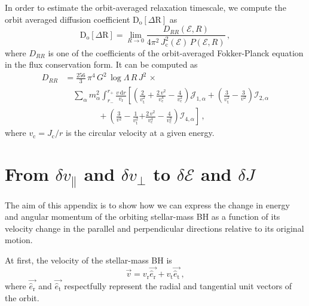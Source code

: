 \documentclass[desactivate]{aa}
\begin{document}
\begin{appendix}
    In order to estimate the orbit-averaged relaxation timescale, we compute the orbit averaged diffusion coefficient $\mathrm{D}_\mathrm{o}[\Delta \mathrm{R}]$ as
    \begin{equation}
        \mathrm{D}_\mathrm{o}[\Delta \mathrm{R}] = \lim_{R\to 0} \frac{D_{RR}(\mathcal{E}, R)}{4\pi^2\,J_\mathrm{c}^2(\mathcal{E})\,P(\mathcal{E}, R)} \, ,
    \end{equation}
    where $D_{RR}$ is one of the coefficients of the orbit-averaged Fokker-Planck equation in the flux conservation form. It can be computed as
    \begin{equation}
    \begin{split}
        D_{RR} &= \frac{256}{3}\, \pi^4 \, G^2\, \log \Lambda\,R\,J^2 \,  \times \\
        &\quad \sum_{\alpha} m_\alpha^2 \int_{r_-}^{r_+} \frac{v\, \mathrm{d}r}{v_\mathrm{r}} \left[\left( \frac{2}{v_\mathrm{t}^2} + \frac{2\,v^2}{v_\mathrm{c}^4}- \frac{4}{v_\mathrm{c}^2} \right) \mathcal{J}_{1,\alpha}+ \left( \frac{3}{v_\mathrm{t}^2} - \frac{3}{v^2} \right) \mathcal{I}_{2,\alpha} \right.\\
        &\qquad \qquad + \left( \frac{3}{v^2} - \frac{1}{v_\mathrm{t}^2} \left. + \frac{2\,v^2}{v_\mathrm{c}^4} - \frac{4}{v_\mathrm{c}^2}  \right) \mathcal{I}_{4,\alpha}\right] \, ,
    \end{split}
    \end{equation}
    where $v_\mathrm{c} = J_\mathrm{c} / r$ is the circular velocity at a given energy.


\section{From $\delta v_\parallel$ and $\delta v_\perp$ to $\delta \mathcal{E}$ and $\delta J$}\label{app:VtoEJ}

    The aim of this appendix is to show how we can express the change in energy and angular momentum of the orbiting stellar-mass BH as a function of its velocity change in the parallel and perpendicular directions relative to its original motion.

    At first, the velocity of the stellar-mass BH is
    \begin{equation}
        \vec{v} = v_\mathrm{r} \vec{\hat{e}_\mathrm{r}} + v_\mathrm{t} \vec{\hat{e}_\mathrm{t}} \, ,
    \end{equation}
    where $\vec{\hat{e}_\mathrm{r}}$ and $\vec{\hat{e}_\mathrm{t}}$ respectfully represent the radial and tangential unit vectors of the orbit.


\end{appendix}
\end{document}
